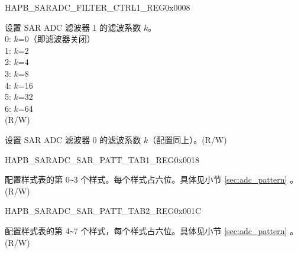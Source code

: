 \begin{register}{H}{APB\_SARADC\_FILTER\_CTRL1\_REG}{0x0008}\label{regdesc:APBSARADCFILTERCTRL1REG}
%
%
%
\regnewline%
\begin{regdesc}\begin{reglist}
\label{fielddesc:APBSARADCFILTERFACTOR1}\item [APB\_SARADC\_FILTER\_FACTOR1] 设置 SAR ADC 滤波器 1 的滤波系数 \(k\)。\\
0: \(k\)=0（即滤波器关闭）\\
1: \(k\)=2\\
2: \(k\)=4\\
3: \(k\)=8\\
4: \(k\)=16\\
5: \(k\)=32\\
6: \(k\)=64\\
(R/W)
\label{fielddesc:APBSARADCFILTERFACTOR0}\item [APB\_SARADC\_FILTER\_FACTOR0] 设置 SAR ADC 滤波器 0 的滤波系数 \(k\)（配置同上）。(R/W)
\end{reglist}\end{regdesc}
\end{register}


\begin{register}{H}{APB\_SARADC\_SAR\_PATT\_TAB1\_REG}{0x0018}\label{regdesc:APBSARADCSARPATTTAB1REG}
%
%
\regnewline%
\begin{regdesc}\begin{reglist}
\label{fielddesc:APBSARADCSARPATTTAB1}\item [APB\_SARADC\_SAR\_PATT\_TAB1] 配置样式表的第 0\verb+~+3 个样式。每个样式占六位。具体见小节 \ref{sec:adc_pattern} \textit{}。 (R/W)
\end{reglist}\end{regdesc}
\end{register}


\begin{register}{H}{APB\_SARADC\_SAR\_PATT\_TAB2\_REG}{0x001C}\label{regdesc:APBSARADCSARPATTTAB2REG}
%
%
\regnewline%
\begin{regdesc}\begin{reglist}
\label{fielddesc:APBSARADCSARPATTTAB2}\item [APB\_SARADC\_SAR\_PATT\_TAB2] 配置样式表的第 4\verb+~+7 个样式，每个样式占六位。具体见小节 \ref{sec:adc_pattern} \textit{}。(R/W)
\end{reglist}\end{regdesc}
\end{register}


